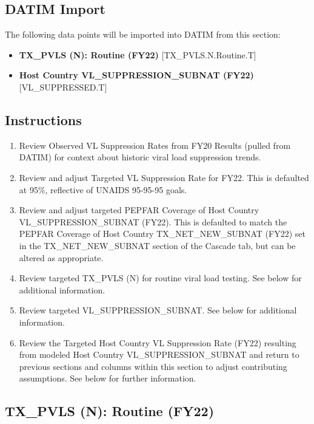 \documentclass[
  openany]{book}
\begin{document}
\hypertarget{datim-import-6}{%
\subsection{DATIM Import}\label{datim-import-6}}

The following data points will be imported into DATIM from this section:

\begin{itemize}
\item
  \textbf{TX\_PVLS (N): Routine (FY22)} {[}TX\_PVLS.N.Routine.T{]}
\item
  \textbf{Host Country VL\_SUPPRESSION\_SUBNAT (FY22)} {[}VL\_SUPPRESSED.T{]}
\end{itemize}

\hypertarget{instructions-6}{%
\subsection{Instructions}\label{instructions-6}}

\begin{enumerate}
\def\labelenumi{\arabic{enumi}.}
\item
  Review Observed VL Suppression Rates from FY20 Results (pulled from
  DATIM) for context about historic viral load suppression trends.
\item
  Review and adjust Targeted VL Suppression Rate for FY22. This is
  defaulted at 95\%, reflective of UNAIDS 95-95-95 goals.
\item
  Review and adjust targeted PEPFAR Coverage of Host Country
  VL\_SUPPRESSION\_SUBNAT (FY22). This is defaulted to match the PEPFAR
  Coverage of Host Country TX\_NET\_NEW\_SUBNAT (FY22) set in the
  TX\_NET\_NEW\_SUBNAT section of the Cascade tab, but can be altered as
  appropriate.
\item
  Review targeted TX\_PVLS (N) for routine viral load testing. See
  below for additional information.
\item
  Review targeted VL\_SUPPRESSION\_SUBNAT. See below for additional
  information.
\item
  Review the Targeted Host Country VL Suppression Rate (FY22)
  resulting from modeled Host Country VL\_SUPPRESSION\_SUBNAT and return
  to previous sections and columns within this section to adjust
  contributing assumptions. See below for further information.
\end{enumerate}

\hypertarget{tx_pvls-n-routine-fy22}{%
\subsection{TX\_PVLS (N): Routine (FY22)}\label{tx_pvls-n-routine-fy22}}
\end{document}
